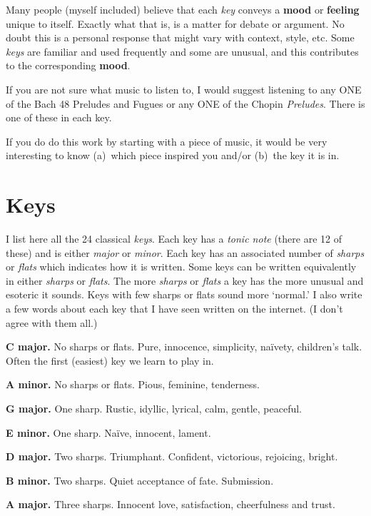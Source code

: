\documentclass[a4paper]{article}
\begin{document}
Many people (myself included) believe that each \textit{key} conveys a
\textbf{mood} or \textbf{feeling} unique to itself.  Exactly what that
is, is a matter for debate or argument. No doubt this is a personal
response that might vary with context, style, etc.  Some
\textit{keys} are familiar and used frequently and some are unusual,
and this contributes to the corresponding \textbf{mood}.

If you are not sure what music to listen to, I would suggest listening
to any ONE of the Bach 48 Preludes and Fugues or any ONE of the Chopin
\textit{Preludes}. There is one of these in each key.

If you do do this work by starting with a piece of music, it would be
very interesting to know (a)~which piece inspired you and/or (b)~the key it is in.

\section{Keys}

I list here all the 24 classical \textit{keys}.  Each key has a
\textit{tonic note} (there are 12 of these) and is either
\textit{major} or \textit{minor}.  Each key has an associated number
of \textit{sharps} or \textit{flats} which indicates how it is
written.  Some keys can be written equivalently in either
\textit{sharps} or \textit{flats}.  The more \textit{sharps} or
\textit{flats} a key has the more unusual and esoteric it sounds. Keys
with few sharps or flats sound more `normal.'  I also write a few
words about each key that I have seen written on the internet.  (I
don't agree with them all.)

\medskip

\noindent\textbf{C major.}  No sharps or flats.
Pure, innocence, simplicity, naïvety, children's talk.  Often the first (easiest) key
we learn to play in.

\noindent\textbf{A minor.}  No sharps or flats.
Pious, feminine, tenderness.

\noindent\textbf{G major.}  One sharp.
Rustic, idyllic, lyrical, calm, gentle, peaceful.

\noindent\textbf{E minor.}  One sharp.
Na\"ive, innocent, lament.

\noindent\textbf{D major.}  Two sharps.
Triumphant. Confident, victorious, rejoicing, bright.

\noindent\textbf{B minor.}  Two sharps.
Quiet acceptance of fate. Submission.

\noindent\textbf{A major.}  Three sharps.
Innocent love, satisfaction,
cheerfulness and trust.
\end{document}

